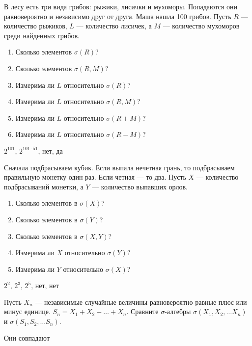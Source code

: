 \begin{problem}
В лесу есть три вида грибов: рыжики, лисички и мухоморы. Попадаются они равновероятно и независимо друг от друга. Маша нашла 100 грибов. Пусть $R$ — количество рыжиков, $L$ — количество лисичек, а $M$ — количество мухоморов среди найденных грибов.
\begin{enumerate}
\item Сколько элементов $ \sigma(R)$?
\item Сколько элементов $ \sigma(R,M)$?
\item Измерима ли $L$ относительно $ \sigma(R)$?
\item Измерима ли $L$ относительно $ \sigma(R,M)$?
\item Измерима ли $L$ относительно $ \sigma(R+M)$?
\item Измерима ли $L$ относительно $ \sigma(R-M)$?
\end{enumerate}

\begin{sol}
$ 2^{101} $, $2^{101\cdot 51}$, нет, да
\end{sol}
\end{problem}

\begin{problem}
Сначала подбрасываем кубик. Если выпала нечетная грань, то подбрасываем правильную монетку один раз. Если четная — то два. Пусть $X$ — количество подбрасываний монетки, а $Y$ — количество выпавших орлов.

\begin{enumerate}

\item Сколько элементов в $ \sigma(X)$?
\item Сколько элементов в $ \sigma(Y)$?
\item Сколько элементов в $ \sigma(X,Y)$?
\item Измерима ли $ X $ относительно $ \sigma(Y)$?
\item Измерима ли $ Y $ относительно $ \sigma(X)$?

\end{enumerate}

\begin{sol}
 $ 2^{2} $, $ 2^{3} $, $ 2^{5} $, нет, нет
\end{sol}
\end{problem}

\begin{problem}
Пусть $X_{n}$ — независимые случайные величины равновероятно равные плюс или минус единице. $S_{n}=X_{1}+X_{2}+\ldots+X_{n}$. Сравните $\sigma$-алгебры $ \sigma(X_{1},X_{2},\ldots X_{n}) $ и $ \sigma(S_{1},S_{2},\ldots S_{n}) $.

\begin{sol}
Они совпадают
\end{sol}
\end{problem}

